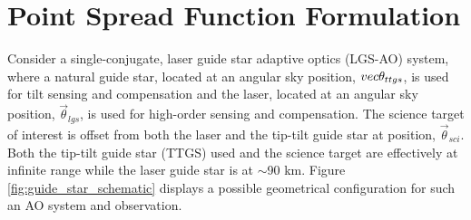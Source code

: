 \section{Point Spread Function Formulation}
\label{sec:psfform}

Consider a single-conjugate, laser guide star adaptive optics
(LGS-AO) system, where a natural guide
star, located at an angular sky position, $\\vec{\theta}_{ttgs}$,
 is used for
tilt sensing and compensation and the laser, located at an angular sky position,
$\vec{\theta}_{lgs}$, is used for high-order sensing and compensation. 
The science target of interest is offset from both the laser and the
tip-tilt guide star at position, $\vec{\theta}_{sci}$.  
Both the tip-tilt guide star (TTGS) used and the science
target are effectively at infinite range while the laser guide star is
at $\sim$90 km. 
Figure \ref{fig:guide_star_schematic} displays a possible geometrical configuration for
such an AO system and observation.


